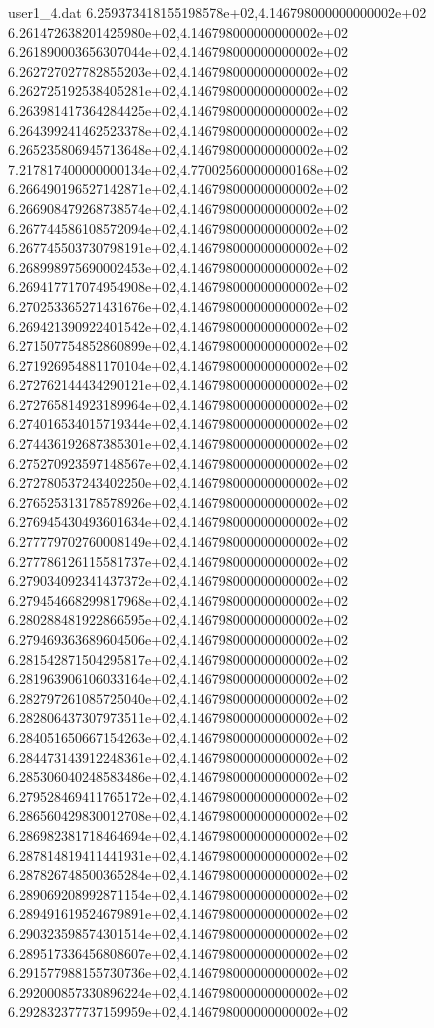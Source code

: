 \begin{filecontents}{user1_4.dat}
6.259373418155198578e+02,4.146798000000000002e+02
6.261472638201425980e+02,4.146798000000000002e+02
6.261890003656307044e+02,4.146798000000000002e+02
6.262727027782855203e+02,4.146798000000000002e+02
6.262725192538405281e+02,4.146798000000000002e+02
6.263981417364284425e+02,4.146798000000000002e+02
6.264399241462523378e+02,4.146798000000000002e+02
6.265235806945713648e+02,4.146798000000000002e+02
7.217817400000000134e+02,4.770025600000000168e+02
6.266490196527142871e+02,4.146798000000000002e+02
6.266908479268738574e+02,4.146798000000000002e+02
6.267744586108572094e+02,4.146798000000000002e+02
6.267745503730798191e+02,4.146798000000000002e+02
6.268998975690002453e+02,4.146798000000000002e+02
6.269417717074954908e+02,4.146798000000000002e+02
6.270253365271431676e+02,4.146798000000000002e+02
6.269421390922401542e+02,4.146798000000000002e+02
6.271507754852860899e+02,4.146798000000000002e+02
6.271926954881170104e+02,4.146798000000000002e+02
6.272762144434290121e+02,4.146798000000000002e+02
6.272765814923189964e+02,4.146798000000000002e+02
6.274016534015719344e+02,4.146798000000000002e+02
6.274436192687385301e+02,4.146798000000000002e+02
6.275270923597148567e+02,4.146798000000000002e+02
6.272780537243402250e+02,4.146798000000000002e+02
6.276525313178578926e+02,4.146798000000000002e+02
6.276945430493601634e+02,4.146798000000000002e+02
6.277779702760008149e+02,4.146798000000000002e+02
6.277786126115581737e+02,4.146798000000000002e+02
6.279034092341437372e+02,4.146798000000000002e+02
6.279454668299817968e+02,4.146798000000000002e+02
6.280288481922866595e+02,4.146798000000000002e+02
6.279469363689604506e+02,4.146798000000000002e+02
6.281542871504295817e+02,4.146798000000000002e+02
6.281963906106033164e+02,4.146798000000000002e+02
6.282797261085725040e+02,4.146798000000000002e+02
6.282806437307973511e+02,4.146798000000000002e+02
6.284051650667154263e+02,4.146798000000000002e+02
6.284473143912248361e+02,4.146798000000000002e+02
6.285306040248583486e+02,4.146798000000000002e+02
6.279528469411765172e+02,4.146798000000000002e+02
6.286560429830012708e+02,4.146798000000000002e+02
6.286982381718464694e+02,4.146798000000000002e+02
6.287814819411441931e+02,4.146798000000000002e+02
6.287826748500365284e+02,4.146798000000000002e+02
6.289069208992871154e+02,4.146798000000000002e+02
6.289491619524679891e+02,4.146798000000000002e+02
6.290323598574301514e+02,4.146798000000000002e+02
6.289517336456808607e+02,4.146798000000000002e+02
6.291577988155730736e+02,4.146798000000000002e+02
6.292000857330896224e+02,4.146798000000000002e+02
6.292832377737159959e+02,4.146798000000000002e+02

\end{filecontents}
